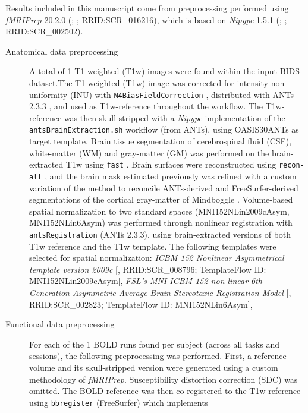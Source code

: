 \documentclass[]{article}
\date{}
\begin{document}
Results included in this manuscript come from preprocessing performed
using \emph{fMRIPrep} 20.2.0 (\citet{fmriprep1}; \citet{fmriprep2};
RRID:SCR\_016216), which is based on \emph{Nipype} 1.5.1
(\citet{nipype1}; \citet{nipype2}; RRID:SCR\_002502).

\begin{description}
\item[Anatomical data preprocessing]
A total of 1 T1-weighted (T1w) images were found within the input BIDS
dataset.The T1-weighted (T1w) image was corrected for intensity
non-uniformity (INU) with \texttt{N4BiasFieldCorrection} \citep{n4},
distributed with ANTs 2.3.3 \citep[RRID:SCR\_004757]{ants}, and used as
T1w-reference throughout the workflow. The T1w-reference was then
skull-stripped with a \emph{Nipype} implementation of the
\texttt{antsBrainExtraction.sh} workflow (from ANTs), using OASIS30ANTs
as target template. Brain tissue segmentation of cerebrospinal fluid
(CSF), white-matter (WM) and gray-matter (GM) was performed on the
brain-extracted T1w using \texttt{fast} \citep[FSL 5.0.9,
RRID:SCR\_002823,][]{fsl_fast}. Brain surfaces were reconstructed using
\texttt{recon-all} \citep[FreeSurfer 6.0.1,
RRID:SCR\_001847,][]{fs_reconall}, and the brain mask estimated
previously was refined with a custom variation of the method to
reconcile ANTs-derived and FreeSurfer-derived segmentations of the
cortical gray-matter of Mindboggle
\citep[RRID:SCR\_002438,][]{mindboggle}. Volume-based spatial
normalization to two standard spaces (MNI152NLin2009cAsym,
MNI152NLin6Asym) was performed through nonlinear registration with
\texttt{antsRegistration} (ANTs 2.3.3), using brain-extracted versions
of both T1w reference and the T1w template. The following templates were
selected for spatial normalization: \emph{ICBM 152 Nonlinear
Asymmetrical template version 2009c} {[}\citet{mni152nlin2009casym},
RRID:SCR\_008796; TemplateFlow ID: MNI152NLin2009cAsym{]}, \emph{FSL's
MNI ICBM 152 non-linear 6th Generation Asymmetric Average Brain
Stereotaxic Registration Model} {[}\citet{mni152nlin6asym},
RRID:SCR\_002823; TemplateFlow ID: MNI152NLin6Asym{]},
\item[Functional data preprocessing]
For each of the 1 BOLD runs found per subject (across all tasks and
sessions), the following preprocessing was performed. First, a reference
volume and its skull-stripped version were generated using a custom
methodology of \emph{fMRIPrep}. Susceptibility distortion correction
(SDC) was omitted. The BOLD reference was then co-registered to the T1w
reference using \texttt{bbregister} (FreeSurfer) which implements

\end{description}
\end{document}
